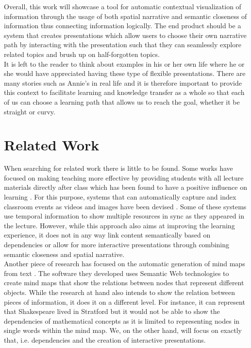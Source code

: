 \documentclass[twoside, 12pt]{article}
\begin{document}
Overall, this work will showcase a tool for automatic contextual visualization of information through the usage of both spatial narrative and semantic closeness of information thus connecting information logically. The end product should be a system that creates presentations which allow users to choose their own narrative path by interacting with the presentation such that they can seamlessly explore related topics and brush up on half-forgotten topics.\\

It is left to the reader to think about examples in his or her own life where he or she would have appreciated having these type of flexible presentations. There are many stories such as Annie's in real life and it is therefore important to provide this context to facilitate learning and knowledge transfer as a whole so that each of us can choose a learning path that allows us to reach the goal, whether it be straight or curvy.

\section{Related Work}
\label{sec:relatedworks}

When searching for related work there is little to be found. Some works have focused on making teaching more effective by providing students with all lecture materials directly after class which has been found to have a positive influence on learning \cite{DBLP:dblp_journals/tochi/BrothertonA04}. For this purpose, systems that can automatically capture and index classroom events as videos and images have been devised \cite{indexedclass:npentrel14}. Some of these systems use temporal information \cite{DBLP:dblp_journals/isci/ChungS97} to show multiple resources in sync as they appeared in the lecture. However, while this approach also aims at improving the learning experience, it does not in any way link content semantically based on dependencies or allow for more interactive presentations through combining semantic closeness and spatial narrative.\\

Another piece of research has focused on the automatic generation of mind maps from text \cite{abdeen2009direct}. The software they developed uses Semantic Web technologies to create mind maps that show the relations between nodes that represent different objects. While the research at hand also intends to show the relation between pieces of information, it does it on a different level. For instance, it can represent that Shakespeare lived in Stratford but it would not be able to show the dependencies of mathematical concepts as it is limited to representing nodes in single words within the mind map. We, on the other hand, will focus on exactly that, i.e. dependencies and the creation of interactive presentations.\\
\end{document}
